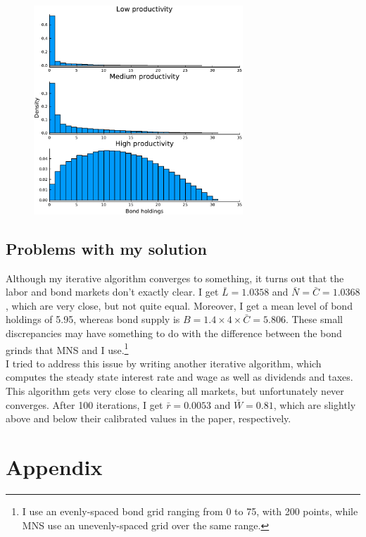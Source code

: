 \documentclass[12pt]{article}
\begin{document}
\begin{figure}[htpb!]
 \centering
        \includegraphics[width=0.7\textwidth]{bonds.pdf}
\end{figure}

\subsection{Problems with my solution}
Although my iterative algorithm converges to something, it turns out that the labor and bond markets don't exactly clear. I get $\bar L = 1.0358$ and $\bar N = \bar C = 1.0368$, which are very close, but not quite equal. Moreover, I get a mean level of bond holdings of 5.95, whereas bond supply is $B = 1.4\times 4 \times \bar C = 5.806$. These small discrepancies may have something to do with the difference between the bond grinds that MNS and I use.\footnote{I use an evenly-spaced bond grid ranging from 0 to 75, with 200 points, while MNS use an unevenly-spaced grid over the same range.}\\

I tried to address this issue by writing another iterative algorithm, which computes the steady state interest rate and wage as well as dividends and taxes. This algorithm gets very close to clearing all markets, but unfortunately never converges. After 100 iterations, I get $\bar r = 0.0053$ and $\bar W = 0.81$, which are slightly above and below their calibrated values in the paper, respectively.

\newpage

\section{Appendix}
\end{document}
